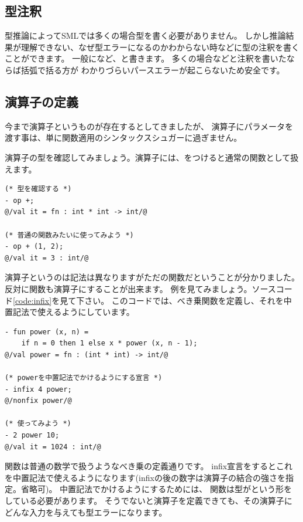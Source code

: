 \documentclass[11pt,a4paper]{jarticle}
\begin{document}
\subsection{型注釈}

型推論によってSMLでは多くの場合型を書く必要がありません。
しかし推論結果が理解できない、なぜ型エラーになるのかわからない時などに型の注釈を書くことができます。
一般になど、と書きます。
多くの場合などと注釈を書いたならば括弧で括る方が
わかりづらいパースエラーが起こらないため安全です。

\subsection{演算子の定義}
今まで演算子というものが存在するとしてきましたが、
演算子にパラメータを渡す事は、単に関数適用のシンタックスシュガーに過ぎません。

演算子の型を確認してみましょう。演算子には、をつけると通常の関数として扱えます。
\begin{lstlisting}[caption=演算子を評価する]
(* 型を確認する *)
- op +;
@/val it = fn : int * int -> int/@

(* 普通の関数みたいに使ってみよう *)
- op + (1, 2);
@/val it = 3 : int/@
\end{lstlisting}

演算子というのは記法は異なりますがただの関数だということが分かりました。
反対に関数も演算子にすることが出来ます。
例を見てみましょう。ソースコード\ref{code:infix}を見て下さい。
このコードでは、べき乗関数を定義し、それを中置記法で使えるようにしています。

\begin{lstlisting}[caption=演算子の定義,label=code:infix]
- fun power (x, n) =
    if n = 0 then 1 else x * power (x, n - 1);
@/val power = fn : (int * int) -> int/@

(* powerを中置記法でかけるようにする宣言 *)
- infix 4 power;
@/nonfix power/@

(* 使ってみよう *)
- 2 power 10;
@/val it = 1024 : int/@
\end{lstlisting}

関数は普通の数学で扱うようなべき乗の定義通りです。
infix宣言をするとこれを中置記法で使えるようになります(infixの後の数字は演算子の結合の強さを指定。省略可)。
中置記法でかけるようにするためには、
関数は型がという形をしている必要があります。
そうでないと演算子を定義できても、その演算子にどんな入力を与えても型エラーになります。
\end{document}
